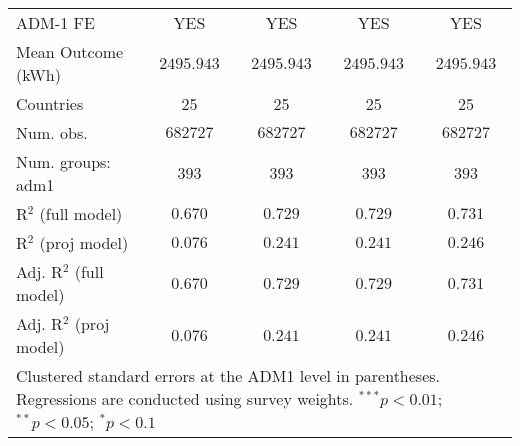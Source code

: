 \begin{table}[htbp]
\begin{center}
\begin{tabular}{l c c c c}
\hline
ADM-1 FE                  & YES           & YES            & YES            & YES            \\
Mean Outcome (kWh)        & $2495.943$    & $2495.943$     & $2495.943$     & $2495.943$     \\
Countries                 & 25            & 25             & 25             & 25             \\
Num. obs.                 & $682727$      & $682727$       & $682727$       & $682727$       \\
Num. groups: adm1         & $393$         & $393$          & $393$          & $393$          \\
R$^2$ (full model)        & $0.670$       & $0.729$        & $0.729$        & $0.731$        \\
R$^2$ (proj model)        & $0.076$       & $0.241$        & $0.241$        & $0.246$        \\
Adj. R$^2$ (full model)   & $0.670$       & $0.729$        & $0.729$        & $0.731$        \\
Adj. R$^2$ (proj model)   & $0.076$       & $0.241$        & $0.241$        & $0.246$        \\
\hline
\multicolumn{5}{l}{\scriptsize{Clustered standard errors at the ADM1 level in parentheses. Regressions are conducted using survey weights. $^{***}p<0.01$; $^{**}p<0.05$; $^{*}p<0.1$}}
\end{tabular}
\label{main: ely_global}
\end{center}
\end{table}
